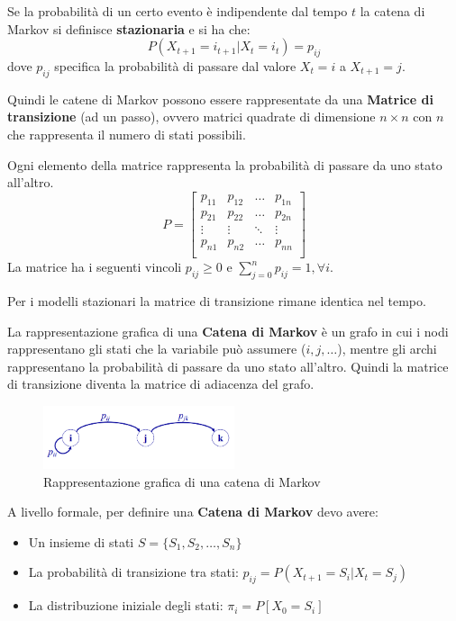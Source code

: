 Se la probabilità di un certo evento è indipendente dal tempo $t$ la catena di
Markov si definisce \textbf{stazionaria} e si ha che:
\begin{equation}
    P(X_{t+1} = i_{t+1 } | X_t =i_t) = p_{ij}
\end{equation}
dove $p_{ij}$ specifica la probabilità di passare dal valore $X_t = i$ a $X_{t + 1} = j$.

Quindi le catene di Markov possono essere rappresentate da una \textbf{Matrice di
    transizione} (ad un passo), ovvero matrici quadrate di dimensione $n \times n$
con $n$ che rappresenta il numero di stati possibili.

Ogni elemento della matrice rappresenta la probabilità di passare da uno stato
all'altro.
\begin{equation*}
    P = \begin{bmatrix}
        p_{11} & p_{12} & \dots  & p_{1n} \\
        p_{21} & p_{22} & \dots  & p_{2n} \\
        \vdots & \vdots & \ddots & \vdots \\
        p_{n1} & p_{n2} & \dots  & p_{nn} \\
    \end{bmatrix}
\end{equation*}
La matrice ha i seguenti vincoli $p_{ij} \geq 0$ e $\sum_{j=0}^{n}p_{ij}=1, \forall i$.
\begin{nota}
    Per i modelli stazionari la matrice di transizione rimane identica nel tempo.
\end{nota}

La rappresentazione grafica di una \textbf{Catena di Markov} è un grafo in cui i
nodi rappresentano gli stati che la variabile può assumere ($i,j,\dots$), mentre
gli archi rappresentano la probabilità di passare da uno stato all'altro. Quindi
la matrice di transizione diventa la matrice di adiacenza del grafo.
\begin{figure}[!ht]
    \centering
    \includegraphics[width=0.5\textwidth]{img/catene/markovChain.png}
    \caption{Rappresentazione grafica di una catena di Markov}
    \label{fig:markovChain}
\end{figure}

A livello formale, per definire una \textbf{Catena di Markov} devo avere:
\begin{itemize}
    \item Un insieme di stati $S = \{S_1, S_2, \dots, S_n\}$
    \item La probabilità di transizione tra stati: $p_{ij} = P(X_{t+1} = S_i | X_t = S_j)$
    \item La distribuzione iniziale degli stati: $\pi_i = P[X_0 = S_i]$
\end{itemize}

